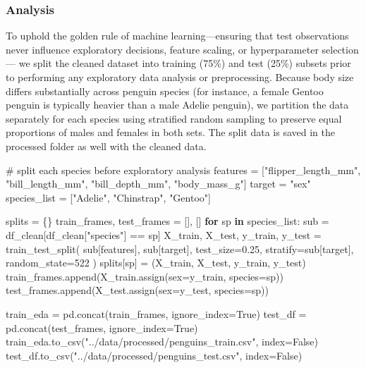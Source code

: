 \documentclass[
  letterpaper,
  DIV=11,
  numbers=noendperiod]{scrartcl}
\newenvironment{Shaded}{\begin{snugshade}}{\end{snugshade}}
\newcommand{\CommentTok}[1]{\textcolor[rgb]{0.37,0.37,0.37}{#1}}
\newcommand{\ControlFlowTok}[1]{\textcolor[rgb]{0.00,0.23,0.31}{\textbf{#1}}}
\newcommand{\DecValTok}[1]{\textcolor[rgb]{0.68,0.00,0.00}{#1}}
\newcommand{\FloatTok}[1]{\textcolor[rgb]{0.68,0.00,0.00}{#1}}
\newcommand{\KeywordTok}[1]{\textcolor[rgb]{0.00,0.23,0.31}{\textbf{#1}}}
\newcommand{\NormalTok}[1]{\textcolor[rgb]{0.00,0.23,0.31}{#1}}
\newcommand{\OperatorTok}[1]{\textcolor[rgb]{0.37,0.37,0.37}{#1}}
\newcommand{\StringTok}[1]{\textcolor[rgb]{0.13,0.47,0.30}{#1}}
\newcommand{\VariableTok}[1]{\textcolor[rgb]{0.07,0.07,0.07}{#1}}
\begin{document}
\subsubsection{Analysis}\label{analysis}

To uphold the golden rule of machine learning---ensuring that test
observations never influence exploratory decisions, feature scaling, or
hyperparameter selection--- we split the cleaned dataset into training
(75\%) and test (25\%) subsets prior to performing any exploratory data
analysis or preprocessing. Because body size differs substantially
across penguin species (for instance, a female Gentoo penguin is
typically heavier than a male Adelie penguin), we partition the data
separately for each species using stratified random sampling to preserve
equal proportions of males and females in both sets. The split data is
saved in the processed folder as well with the cleaned data.

\begin{Shaded}
\begin{Highlighting}[]
\CommentTok{\# split each species before exploratory analysis}
\NormalTok{features }\OperatorTok{=}\NormalTok{ [}\StringTok{"flipper\_length\_mm"}\NormalTok{, }\StringTok{"bill\_length\_mm"}\NormalTok{, }\StringTok{"bill\_depth\_mm"}\NormalTok{, }\StringTok{"body\_mass\_g"}\NormalTok{]}
\NormalTok{target }\OperatorTok{=} \StringTok{"sex"}
\NormalTok{species\_list }\OperatorTok{=}\NormalTok{ [}\StringTok{"Adelie"}\NormalTok{, }\StringTok{"Chinstrap"}\NormalTok{, }\StringTok{"Gentoo"}\NormalTok{]}

\NormalTok{splits }\OperatorTok{=}\NormalTok{ \{\}}
\NormalTok{train\_frames, test\_frames }\OperatorTok{=}\NormalTok{ [], []}
\ControlFlowTok{for}\NormalTok{ sp }\KeywordTok{in}\NormalTok{ species\_list:}
\NormalTok{    sub }\OperatorTok{=}\NormalTok{ df\_clean[df\_clean[}\StringTok{"species"}\NormalTok{] }\OperatorTok{==}\NormalTok{ sp]}
\NormalTok{    X\_train, X\_test, y\_train, y\_test }\OperatorTok{=}\NormalTok{ train\_test\_split(}
\NormalTok{        sub[features], sub[target], test\_size}\OperatorTok{=}\FloatTok{0.25}\NormalTok{, stratify}\OperatorTok{=}\NormalTok{sub[target], random\_state}\OperatorTok{=}\DecValTok{522}
\NormalTok{    )}
\NormalTok{    splits[sp] }\OperatorTok{=}\NormalTok{ (X\_train, X\_test, y\_train, y\_test)}
\NormalTok{    train\_frames.append(X\_train.assign(sex}\OperatorTok{=}\NormalTok{y\_train, species}\OperatorTok{=}\NormalTok{sp))}
\NormalTok{    test\_frames.append(X\_test.assign(sex}\OperatorTok{=}\NormalTok{y\_test, species}\OperatorTok{=}\NormalTok{sp))}

\NormalTok{train\_eda }\OperatorTok{=}\NormalTok{ pd.concat(train\_frames, ignore\_index}\OperatorTok{=}\VariableTok{True}\NormalTok{)}
\NormalTok{test\_df }\OperatorTok{=}\NormalTok{ pd.concat(test\_frames, ignore\_index}\OperatorTok{=}\VariableTok{True}\NormalTok{)}
\NormalTok{train\_eda.to\_csv(}\StringTok{"../data/processed/penguins\_train.csv"}\NormalTok{, index}\OperatorTok{=}\VariableTok{False}\NormalTok{)}
\NormalTok{test\_df.to\_csv(}\StringTok{"../data/processed/penguins\_test.csv"}\NormalTok{, index}\OperatorTok{=}\VariableTok{False}\NormalTok{)}
\end{Highlighting}
\end{Shaded}
\end{document}
